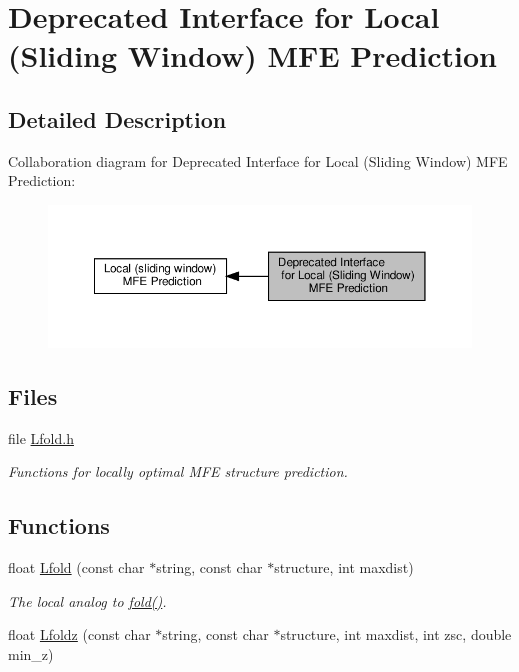 \hypertarget{group__mfe__window__deprecated}{}\section{Deprecated Interface for Local (Sliding Window) M\+FE Prediction}
\label{group__mfe__window__deprecated}


\subsection{Detailed Description}
Collaboration diagram for Deprecated Interface for Local (Sliding Window) M\+FE Prediction\+:
\nopagebreak
\begin{figure}[H]
\begin{center}
\leavevmode
\includegraphics[width=350pt]{group__mfe__window__deprecated}
\end{center}
\end{figure}
\subsection*{Files}
\begin{DoxyCompactItemize}
\item 
file \hyperlink{Lfold_8h}{Lfold.\+h}
\begin{DoxyCompactList}\small\item\em Functions for locally optimal M\+FE structure prediction. \end{DoxyCompactList}\end{DoxyCompactItemize}
\subsection*{Functions}
\begin{DoxyCompactItemize}
\item 
float \hyperlink{group__mfe__window__deprecated_gafdd1e11b5c7ad443b9f86b818e67bab4}{Lfold} (const char $\ast$string, const char $\ast$structure, int maxdist)
\begin{DoxyCompactList}\small\item\em The local analog to \hyperlink{group__mfe__global__deprecated_gaadafcb0f140795ae62e5ca027e335a9b}{fold()}. \end{DoxyCompactList}\item 
float \hyperlink{group__mfe__window__deprecated_ga9b568887c6091a54252729adcb35f6d2}{Lfoldz} (const char $\ast$string, const char $\ast$structure, int maxdist, int zsc, double min\+\_\+z)
\end{DoxyCompactItemize}


